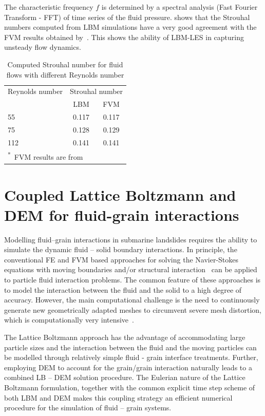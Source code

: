 \noindent The characteristic frequency $f$ is determined by a spectral 
analysis (Fast Fourier Transform - FFT) of time series of the fluid pressure. 
 shows that the Strouhal numbers computed from LBM 
simulations have a very good agreement with the FVM results obtained 
by~\citet{Breuer2000}. This shows the ability of LBM-LES in 
capturing unsteady flow dynamics.


\begin{table}[tbhp]
	\caption{Computed Strouhal number for fluid flows with different Reynolds 
	number}
	\label{table:strouhal}
	\centering
	\begin{tabular}{l c c}
		\toprule
		Reynolds number & \multicolumn{2}{c}{Strouhal number} \\
		\cmidrule{2-3}
		& LBM & FVM \\
		\midrule
		55		& 0.117	 &	0.117 \\
		75		& 0.128	 &	0.129 \\
		112		& 0.141  &	0.141 \\
		\bottomrule
		\multicolumn{3}{l}{\footnotesize{\textsuperscript{*}~FVM results are 
		from~\citet{Breuer2000}}}
	\end{tabular}
\end{table}




\section[Coupled LBM -- DEM for fluid--grain interactions]{Coupled Lattice 
Boltzmann and DEM for fluid-grain interactions}

Modelling fluid--grain interactions in submarine landslides requires the 
ability to simulate the dynamic fluid -- solid boundary interactions. In 
principle, the conventional FE and FVM based 
approaches for solving the Navier-Stokes equations with moving boundaries 
and/or structural interaction~\citep{Bathe2004} can be applied to particle 
fluid interaction problems. The common feature of these approaches is to model 
the interaction between the fluid and the solid to a high degree of 
accuracy. However, the main computational challenge is the need to continuously 
generate new geometrically adapted meshes to circumvent severe mesh distortion, 
which is computationally very intensive~\citep{Han2007a}. 

The Lattice Boltzmann approach has the advantage of accommodating large 
particle sizes and the interaction between the fluid and the moving particles 
can be modelled through relatively simple fluid - grain interface treatments. 
Further, employing DEM to account for the grain/grain interaction naturally 
leads to a combined LB -- DEM solution procedure. The Eulerian nature 
of the Lattice Boltzmann formulation, together with the common explicit time 
step scheme of both LBM and DEM makes this coupling strategy an efficient 
numerical procedure for the simulation of fluid -- grain systems. 

